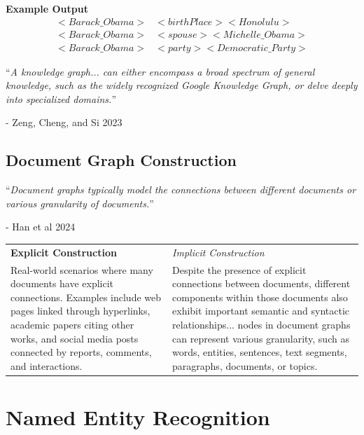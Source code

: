 \begin{bsp}
    \textbf{Example Output}
    \begin{align*}
        <Barack\_Obama> & <birthPlace> <Honolulu> \\
        <Barack\_Obama> & <spouse> <Michelle\_Obama> \\
        <Barack\_Obama> & <party> <Democratic\_Party>
    \end{align*}
\end{bsp}

\begin{center}
    ``\textit{A knowledge graph... can either encompass a broad spectrum of general knowledge, such as
    the widely recognized Google Knowledge Graph, or delve deeply into specialized domains.}''
\end{center}
- Zeng, Cheng, and Si 2023

\subsection{Document Graph Construction}
\begin{center}
    ``\textit{Document graphs typically model the connections between different documents or
    various granularity of documents.}''
\end{center}
- Han et al 2024


\begin{mytable}
    \begin{tabular}{p{} p{}}
        \textbf{Explicit Construction} & \textit{Implicit Construction} \\
         Real-world scenarios where many documents have explicit connections.
        Examples
        include web pages linked through hyperlinks, academic papers citing other works, and
        social media posts connected by reports, comments, and interactions.
        &
        Despite the presence of explicit connections between documents, different components
        within those documents also exhibit important semantic and syntactic relationships...
        nodes in document graphs can represent various granularity, such as words, entities,
        sentences, text segments, paragraphs, documents, or topics.
    \end{tabular}
\end{mytable}


\section{Named Entity Recognition}

